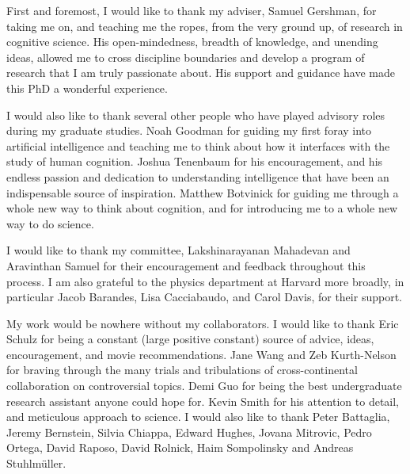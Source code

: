 

First and foremost, I would like to thank my adviser, Samuel Gershman, for taking me on, and teaching me the ropes, from the very ground up, of research in cognitive science. His open-mindedness, breadth of knowledge, and unending ideas, allowed me to cross discipline boundaries and develop a program of research that I am truly passionate about. His support and guidance have made this PhD a wonderful experience.

I would also like to thank several other people who have played advisory roles during my graduate studies. Noah Goodman for guiding my first foray into artificial intelligence and teaching me to think about how it interfaces with the study of human cognition. Joshua Tenenbaum for his encouragement, and his endless passion and dedication to understanding intelligence that have been an indispensable source of inspiration. Matthew Botvinick for guiding me through a whole new way to think about cognition, and for introducing me to a whole new way to do science.

I would like to thank my committee, Lakshinarayanan Mahadevan and Aravinthan Samuel for their encouragement and feedback throughout this process. I am also grateful to the physics department at Harvard more broadly, in particular Jacob Barandes, Lisa Cacciabaudo, and Carol Davis, for their support.

My work would be nowhere without my collaborators. I would like to thank Eric Schulz for being a constant (large positive constant) source of advice, ideas, encouragement, and movie recommendations. Jane Wang and Zeb Kurth-Nelson for braving through the many trials and tribulations of cross-continental collaboration on controversial topics. Demi Guo for being the best undergraduate research assistant anyone could hope for. Kevin Smith for his attention to detail, and meticulous approach to science. I would also like to thank Peter Battaglia, Jeremy Bernstein, Silvia Chiappa, Edward Hughes, Jovana Mitrovic, Pedro Ortega, David Raposo, David Rolnick, Haim Sompolinsky and Andreas Stuhlmüller.

